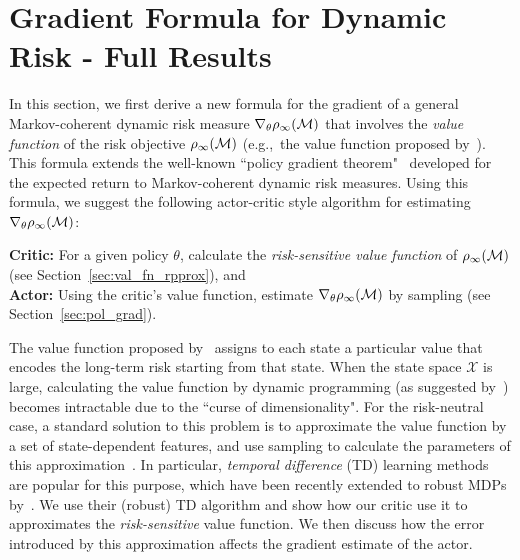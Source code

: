 

\section{Gradient Formula for Dynamic Risk - Full Results}
\label{sec:dynamic}

In this section, we first derive a new formula for the gradient of a general Markov-coherent dynamic risk measure $\nabla_{\theta} \rho_\infty(\mathcal{M})$ that involves the \emph{value function} of the risk objective $\rho_\infty(\mathcal{M})$ (e.g.,~the value function proposed by~\citealt{ruszczynski2010risk}). This formula extends the well-known ``policy gradient theorem"~\cite{sutton_policy_2000,konda2000actor} developed for the expected return to Markov-coherent dynamic risk measures. Using this formula, we suggest the following actor-critic style algorithm for estimating $\nabla_{\theta} \rho_\infty(\mathcal{M})$:

\textbf{Critic:} For a given policy $\theta$, calculate the \emph{risk-sensitive value function} of $\rho_\infty(\mathcal{M})$ (see Section~\ref{sec:val_fn_rpprox}), and \\
\textbf{Actor:} Using the critic's value function, estimate $\nabla_{\theta} \rho_\infty(\mathcal{M})$ by sampling (see Section~\ref{sec:pol_grad}).

The value function proposed by~\citet{ruszczynski2010risk} assigns to each state a particular value that encodes the long-term risk starting from that state. When the state space $\mathcal X$ is large, calculating the value function by dynamic programming (as suggested by~\citealt{ruszczynski2010risk}) becomes intractable due to the ``curse of dimensionality". For the risk-neutral case, a standard solution to this problem is to approximate the value function by a set of state-dependent features, and use sampling to calculate the parameters of this approximation~\citep{BT96}. In particular, \emph{temporal difference} (TD) learning methods~\cite{sutton_reinforcement_1998} are popular for this purpose, which have been recently extended to robust MDPs by~\citet{tamar2014robust}. We use their (robust) TD algorithm and show how our critic use it to approximates the {\em risk-sensitive} value function. We then discuss how the error introduced by this approximation affects the gradient estimate of the actor.

